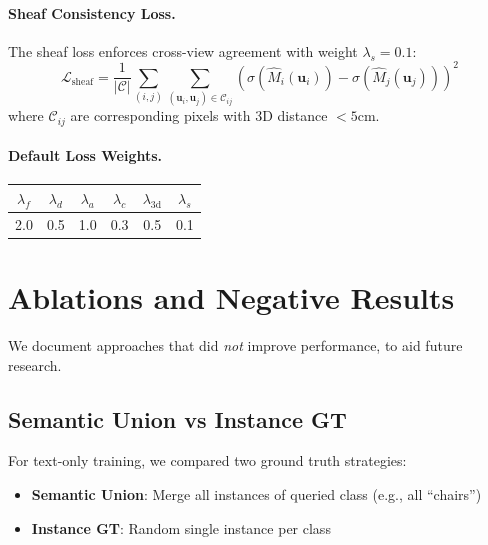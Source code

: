 \paragraph{Sheaf Consistency Loss.}
The sheaf loss enforces cross-view agreement with weight $\lambda_s = 0.1$:
\begin{equation}
\mathcal{L}_{\text{sheaf}} = \frac{1}{|\mathcal{C}|} \sum_{(i,j)} \sum_{(\mathbf{u}_i, \mathbf{u}_j) \in \mathcal{C}_{ij}} \left( \sigma(\hat{M}_i(\mathbf{u}_i)) - \sigma(\hat{M}_j(\mathbf{u}_j)) \right)^2
\end{equation}
where $\mathcal{C}_{ij}$ are corresponding pixels with 3D distance $< 5$cm.

\paragraph{Default Loss Weights.}
\begin{center}
\small
\begin{tabular}{@{}cccccc@{}}
$\lambda_f$ & $\lambda_d$ & $\lambda_a$ & $\lambda_c$ & $\lambda_{\text{3d}}$ & $\lambda_s$ \\
\midrule
2.0 & 0.5 & 1.0 & 0.3 & 0.5 & 0.1 \\
\end{tabular}
\end{center}

\section{Ablations and Negative Results}
\label{app:negative}

We document approaches that did \textit{not} improve performance, to aid future research.



\subsection{Semantic Union vs Instance GT}

For text-only training, we compared two ground truth strategies:
\begin{itemize}[nosep,leftmargin=*]
    \item \textbf{Semantic Union}: Merge all instances of queried class (e.g., all ``chairs'')
    \item \textbf{Instance GT}: Random single instance per class
\end{itemize}

